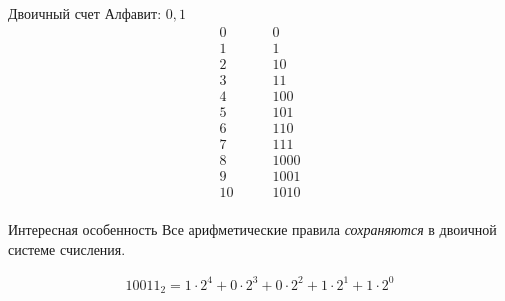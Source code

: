 \documentclass[hyperref=unicode, aspectratio=169]{beamer}
\begin{document}
\begin{frame}{Двоичный счет}
    Алфавит: $0, 1$
    \begin{align*}
        0  \qquad & 0    \\
        1  \qquad & 1    \\
        2  \qquad & 10   \\
        3  \qquad & 11   \\
        4  \qquad & 100  \\
        5  \qquad & 101  \\
        6  \qquad & 110  \\
        7  \qquad & 111  \\
        8  \qquad & 1000 \\
        9  \qquad & 1001 \\
        10 \qquad & 1010 \\
    \end{align*}
\end{frame}

\begin{frame}{Интересная особенность}
    Все арифметические правила \textit{сохраняются} в двоичной системе счисления.
    \begin{example}
        \begin{gather*}
            10011_2 = 1 \cdot 2^4 + 0 \cdot 2^3 + 0 \cdot 2^2 + 1 \cdot 2^1 + 1 \cdot 2^0
        \end{gather*}
    \end{example}
\end{frame}
\end{document}
